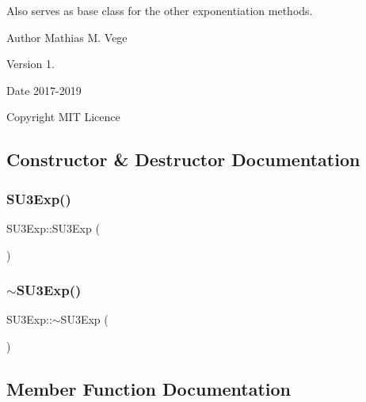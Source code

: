 Also serves as base class for the other exponentiation methods.

\begin{DoxyAuthor}{Author}
Mathias M. Vege 
\end{DoxyAuthor}
\begin{DoxyVersion}{Version}
1. 
\end{DoxyVersion}
\begin{DoxyDate}{Date}
2017-\/2019 
\end{DoxyDate}
\begin{DoxyCopyright}{Copyright}
M\+IT Licence 
\end{DoxyCopyright}


\subsection{Constructor \& Destructor Documentation}
\mbox{\label{class_s_u3_exp_a98afc0784d4b7fd89951ffa7d1209de6}} 
\subsubsection{\texorpdfstring{SU3Exp()}{SU3Exp()}}
{\footnotesize\ttfamily S\+U3\+Exp\+::\+S\+U3\+Exp (\begin{DoxyParamCaption}{ }\end{DoxyParamCaption})}

\mbox{\label{class_s_u3_exp_a68dc1c6cf615a08251d9976ca779b6ce}} 
\subsubsection{\texorpdfstring{$\sim$SU3Exp()}{~SU3Exp()}}
{\footnotesize\ttfamily S\+U3\+Exp\+::$\sim$\+S\+U3\+Exp (\begin{DoxyParamCaption}{ }\end{DoxyParamCaption})\hspace{0.3cm}{\ttfamily [virtual]}}



\subsection{Member Function Documentation}
\mbox{\label{class_s_u3_exp_a9760c17b9c3a4b6d0a5cd4d88c6d577e}} 
